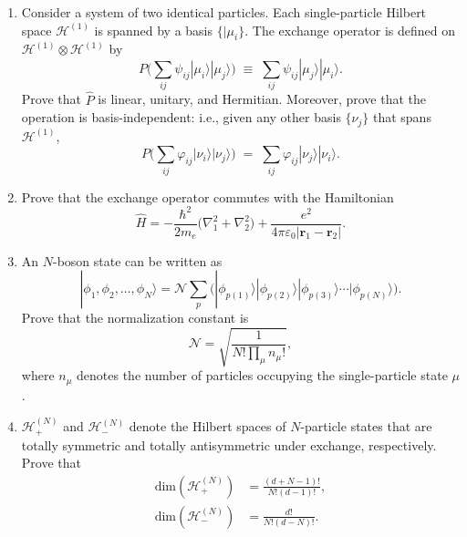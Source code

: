 \documentclass[prx,12pt]{revtex4-2}
\begin{document}
\begin{enumerate}
\item Consider a system of two identical particles.  Each
  single-particle Hilbert space $\mathscr{H}^{(1)}$ is spanned by a
  basis $\{|\mu_i\}$.  The exchange operator is defined on
  $\mathscr{H}^{(1)} \otimes \mathscr{H}^{(1)}$ by
  \begin{equation}
    P \Big (\sum_{ij} \psi_{ij} |\mu_i\rangle|\mu_j\rangle \Big)
    \;\equiv\;  \sum_{ij} \psi_{ij} |\mu_j\rangle|\mu_i\rangle.
  \end{equation}
  Prove that $\hat{P}$ is linear, unitary, and Hermitian.  Moreover,
  prove that the operation is basis-independent: i.e., given any other
  basis $\{\nu_j\}$ that spans $\mathscr{H}^{(1)}$,
  \begin{equation}
    P \Big (\sum_{ij} \varphi_{ij} |\nu_i\rangle|\nu_j\rangle \Big)
    \;=\;  \sum_{ij} \varphi_{ij} |\nu_j\rangle|\nu_i\rangle.
  \end{equation}
  \label{ex:1}

\item
  Prove that the exchange operator commutes with the Hamiltonian
  \begin{equation}
    \hat{H} = - \frac{\hbar^2}{2m_e} \Big(\nabla_1^2 + \nabla^2_2\Big) + \frac{e^2}{4\pi\varepsilon_0|\mathbf{r}_1 - \mathbf{r}_2|}.
  \end{equation}
  \label{ex:2}

\item
  An $N$-boson state can be written as
  \begin{equation}
    |\phi_1,\phi_2,\dots,\phi_N\rangle = \mathcal{N} \sum_p \Big(|\phi_{p(1)}\rangle  |\phi_{p(2)}\rangle  |\phi_{p(3)}\rangle  \cdots  |\phi_{p(N)}\rangle\Big).
  \end{equation}
  Prove that the normalization constant is
  \begin{equation}
    \mathcal{N} = \sqrt{\frac{1}{N!\prod_\mu n_\mu!}},
  \end{equation}
  where $n_\mu$ denotes the number of particles occupying the
  single-particle state $\mu$.
  \label{ex:boson_norm}

\item $\mathscr{H}_{+}^{(N)}$ and $\mathscr{H}_{-}^{(N)}$ denote the
  Hilbert spaces of $N$-particle states that are totally symmetric and
  totally antisymmetric under exchange, respectively.  Prove that
  \begin{align}
    \mathrm{dim}\left(\mathscr{H}_{+}^{(N)}\right) &= \frac{(d+N-1)!}{N!(d-1)!}, \\
    \mathrm{dim}\left(\mathscr{H}_{-}^{(N)}\right) &= \frac{d!}{N!(d-N)!}.
  \end{align}


\end{enumerate}
\end{document}
